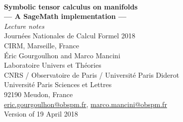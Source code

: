 \documentclass[12pt,a4paper]{book}
\begin{document}

\begin{titlepage}
\
\vspace{4cm}
\begin{center}
{\Huge\textbf{Symbolic tensor calculus on manifolds}}\\[2ex]
{\LARGE\textbf{--- A SageMath implementation ---}}\\[3ex]
{\LARGE\emph{Lecture notes}}\\[1ex]
{\Large Journées Nationales de Calcul Formel 2018\\[1ex]
CIRM, Marseille, France}\\[8ex]
{\large Éric Gourgoulhon and Marco Mancini} \\[1ex]
Laboratoire Univers et Théories \\
CNRS / Observatoire de Paris / Université Paris Diderot\\
Université Paris Sciences et Lettres \\
92190 Meudon, France \\
\href{mailto:eric.gourgoulhon@obspm.fr}{eric.gourgoulhon@obspm.fr},
\href{mailto:marco.mancini@obspm.fr}{marco.mancini@obspm.fr} \\[4ex]
Version of 19 April 2018
\end{center}
\end{titlepage}

\dominitoc

\newpage


\tableofcontents












\end{document}
